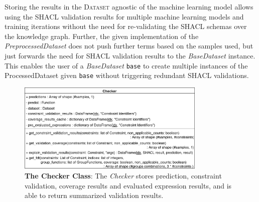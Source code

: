 Storing the results in the \textsc{Dataset} agnostic of the machine learning model allows using the SHACL validation results for multiple machine learning models and training iterations without the need for re-validating the SHACL schemas over the knowledge graph. Further, the given implementation of the \emph{PreprocessedDataset} does not push further  terms based on the samples used, but just forwards the need for SHACL validation results to the \emph{BaseDataset} instance. This enables the user of a \emph{BaseDataset} \texttt{base} to create multiple instances of the ProcessedDataset given \texttt{base} without triggering redundant SHACL validations.

\begin{figure}
    \centering
    \includegraphics[width=0.8\textwidth]{images/implementation/checker.png}
    \caption{\textbf{The Checker Class}: The \emph{Checker} stores prediction, constraint validation, coverage results and evaluated expression results, and is able to return summarized validation results.}
    \label{fig:checker_implementation}
\end{figure}

